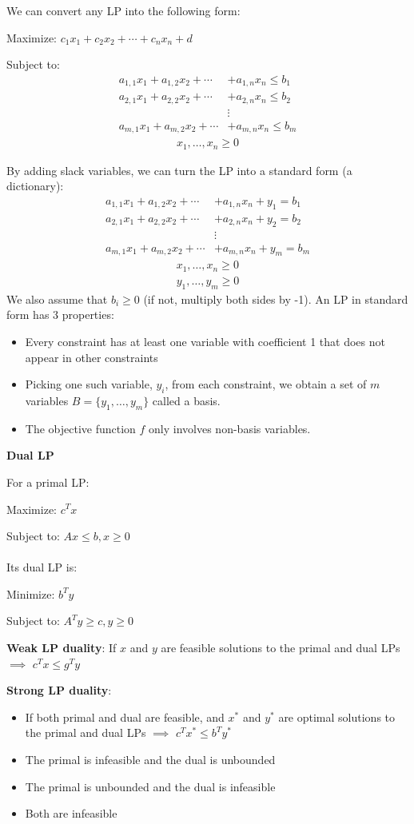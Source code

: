 \documentclass{article}
\begin{document}
We can convert any LP into the following form:

Maximize: $ c_1x_1 + c_2x_2 + \cdots + c_nx_n + d$

Subject to:
\begin{align*}
a_{1,1}x_1 + a_{1,2}x_2 + \cdots& + a_{1,n}x_n \le b_1 \\
a_{2,1}x_1 + a_{2,2}x_2 + \cdots& + a_{2,n}x_n \le b_2 \\
&\vdots \\
a_{m, 1}x_1 + a_{m,2}x_2 +\cdots& + a_{m, n}x_n \le b_m 
\end{align*}
\begin{align*}
x_1,\ldots, x_n \ge 0
\end{align*}

By adding slack variables, we can turn the LP into a standard form (a dictionary):
\begin{align*}
	a_{1,1}x_1 + a_{1,2}x_2 + \cdots& + a_{1,n}x_n + y_1= b_1 \\
	a_{2,1}x_1 + a_{2,2}x_2 + \cdots& + a_{2,n}x_n +y_2= b_2 \\
	&\vdots \\
	a_{m, 1}x_1 + a_{m,2}x_2 +\cdots& + a_{m, n}x_n +y_m= b_m 
\end{align*}
\begin{align*}
	x_1,\ldots, x_n \ge 0\\
		y_1,\ldots, y_m \ge 0
\end{align*}
We also assume that $b_i \ge 0$ (if not, multiply both sides by -1). An LP in standard form has 3 properties:
\begin{itemize}
\item Every constraint has at least one variable with coefficient 1 that does not appear in other constraints
\item Picking one such variable, $y_i$, from each constraint, we obtain a set of $m$ variables $B=\{y_1,\ldots,y_m\}$ called a basis.
\item The objective function $f$ only involves non-basis variables.
\end{itemize}
\newpage
\textbf{Dual LP}

For a primal LP:

Maximize: $c^Tx$

Subject to: $Ax \le b, x \ge 0$
\\~\\
Its dual LP is:

Minimize: $b^Ty$

Subject to: $A^Ty \ge c, y \ge 0$

\textbf{Weak LP duality}: If $x$ and $y$ are feasible solutions to the primal and dual LPs $\implies$ $c^Tx \le g^Ty$

\textbf{Strong LP duality}: 
\begin{itemize}
\item If both primal and dual are feasible, and $x^*$ and $y^*$ are optimal solutions to the primal and dual LPs $\implies$ $c^Tx^* \le b^Ty^*$
\item The primal is infeasible and the dual is unbounded
\item The primal is unbounded and the dual is infeasible
\item Both are infeasible
\end{itemize}
\end{document}
